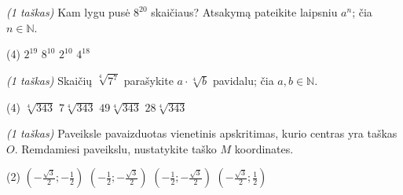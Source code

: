 \documentclass[a4paper]{article}
\begin{document}
\begin{enumerate}
      \item \textit{(1 taškas)} Kam lygu pusė $8^{20}$ skaičiaus? Atsakymą
            pateikite laipsniu $a^n$; čia $n \in \mathbb{N}$.
            \begin{tasks}[item-format={\normalfont}, after-item-skip=2mm,
                        label=\Alph*, label-format={\bfseries}](4)
                  \task $2^{19}$
                  \task $8^{10}$
                  \task $2^{10}$
                  \task $4^{18}$
            \end{tasks}
      \item \textit{(1 taškas)} Skaičių $\sqrt[4]{7^7}$ parašykite
            $a\cdot\sqrt[4]{b}$ pavidalu; čia $a, b \in \mathbb{N}$.
            \begin{tasks}[item-format={\normalfont}, after-item-skip=2mm,
                        label=\Alph*, label-format={\bfseries}](4)
                  \task $\sqrt[4]{343}$
                  \task $7\sqrt[4]{343}$
                  \task $49\sqrt[4]{343}$
                  \task $28\sqrt[4]{343}$
            \end{tasks}

            \begin{minipage}[t]{0.725\linewidth}
                  \item \textit{(1 taškas)} Paveiksle pavaizduotas vienetinis
                  apskritimas, kurio centras yra taškas $O$. Remdamiesi
                  paveikslu, nustatykite
                  taško $M$ koordinates.
                  \vspace{2mm}
                  \begin{tasks}[item-format={\normalfont},
                              after-item-skip=3mm,
                              label=\Alph*), label-format={\bfseries},
                              column-sep=10pt](2)
                        \task $(-\frac{\sqrt{3}}{2};-\frac{1}{2})$
                        \task $(-\frac{1}{2};-\frac{\sqrt{3}}{2})$
                        \task $(-\frac{1}{2};-\frac{\sqrt{3}}{2})$
                        \task $(-\frac{\sqrt{3}}{2};\frac{1}{2})$
                  \end{tasks}

            \end{minipage}
            \begin{minipage}[t]{0.25\linewidth}
\end{minipage}
\end{enumerate}
\end{document}
